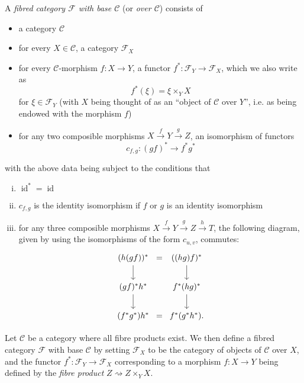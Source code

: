 \documentclass{article}
\theoremstyle{plain}
\theoremstyle{definition}
\newenvironment{definition}[1]
  {\renewcommand\theinnercustomdefinition{#1}\innercustomdefinition}
  {\endinnercustomdefinition}
\newenvironment{example}[1]
  {\renewcommand\theinnercustomexample{#1}\innercustomexample}
  {\endinnercustomexample}
\newcommand{\sh}[1]{{\mathscr{#1}}}
\newcommand{\cat}[1]{{\mathcal{#1}}}
\DeclareMathOperator{\id}{id}
\begin{document}
\begin{definition}{1.1}
\label{definition:A.1.1}
  A \emph{fibred category $\sh{F}$ with base $\cat{C}$} (or \emph{over $\cat{C}$}) consists of
  \begin{itemize}
    \item a category $\cat{C}$
    \item for every $X\in\cat{C}$, a category $\sh{F}_X$
    \item for every $\cat{C}$-morphism $f\colon X\to Y$, a functor $f^*\colon\sh{F}_Y\to\sh{F}_X$, which we also write as
      \[
        f^*(\xi) = \xi \times_Y X
      \]
      for $\xi\in\sh{F}_Y$ (with $X$ being thought of as an ``object of $\cat{C}$ over $Y$'', i.e. as being endowed with the morphism $f$)
    \item for any two composible morphisms $X\xrightarrow{f}Y\xrightarrow{g}Z$, an isomorphism of functors
      \[
        c_{f,g}\colon (gf)^* \to f^*g^*
      \]
  \end{itemize}
  with the above data being subject to the conditions that
  \begin{enumerate}[(i)]
    \item $\id^*=\id$
    \item $c_{f,g}$ is the identity isomorphism if $f$ or $g$ is an identity isomorphism
    \item for any three composible morphisms $X\xrightarrow{f}Y\xrightarrow{g}Z\xrightarrow{h}T$, the following diagram, given by using the isomorphisms of the form $c_{u,v}$, commutes:
      \[
        \begin{tikzcd}[column sep=0]
          (h(gf))^* \dar &=& ((hg)f)^* \dar
        \\(gf)^*h^* \dar && f^*(hg)^* \dar
        \\(f^*g^*)h^* &=& f^*(g^*h^*).
        \end{tikzcd}
      \]
  \end{enumerate}
\end{definition}

\begin{example}{1}
\label{example:A.1.1(1)}
  Let $\cat{C}$ be a category where all fibre products exist.
  We then define a fibred category $\sh{F}$ with base $\cat{C}$ by setting $\sh{F}_X$ to be the category of objects of $\cat{C}$ over $X$, and the functor $f^*\colon\sh{F}_Y\to\sh{F}_X$ corresponding to a morphism $f\colon X\to Y$ being defined by the \emph{fibre product} $Z\rightsquigarrow Z\times_Y X$.
\end{example}
\end{document}
